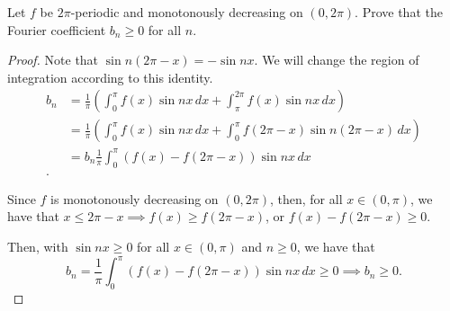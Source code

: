 \documentclass[../hw5]{subfiles}
\begin{document}
\begin{problem}
Let $f$ be $2\pi$-periodic and monotonously decreasing on $(0,2\pi)$.
Prove that the Fourier coefficient $b_n\ge 0$ for all $n$.
\end{problem}
\begin{proof}
	Note that $\sin{n(2\pi-x)}=-\sin{nx}$.
	We will change the region of integration according to this identity.
	\begin{align*}
		b_n & = \frac{1}{\pi}\left( \int_{0}^{\pi} f(x)\sin{nx}\,dx + \int_{\pi}^{2\pi}f(x)\sin{nx}\,dx\right)             \\
		    & = \frac{1}{\pi}\left( \int_{0}^{\pi} f(x)\sin{nx}  \,dx + \int_{0}^{\pi} f(2\pi-x)\sin{n(2\pi-x)}\,dx\right) \\
		    & = b_n \frac{1}{\pi}\int_{0}^{\pi} (f(x)-f(2\pi-x))\sin{nx}\,dx                                               \\
		.\end{align*}

	Since $f$ is monotonously decreasing on $(0,2\pi)$, then, for all $x \in (0,\pi)$, we have that $x\le 2\pi-x \implies f(x)\ge f(2\pi-x)$, or $f(x)-f(2\pi-x)\ge 0$.

	Then, with $\sin{nx}\ge 0$ for all $x \in (0,\pi)$ and $n\ge 0$, we have that \[
		b_n = \frac{1}{\pi}\int_{0}^{\pi} (f(x)-f(2\pi-x))\sin{nx} \,dx \ge 0 \implies b_n \ge 0
		.\]
\end{proof}
\end{document}
